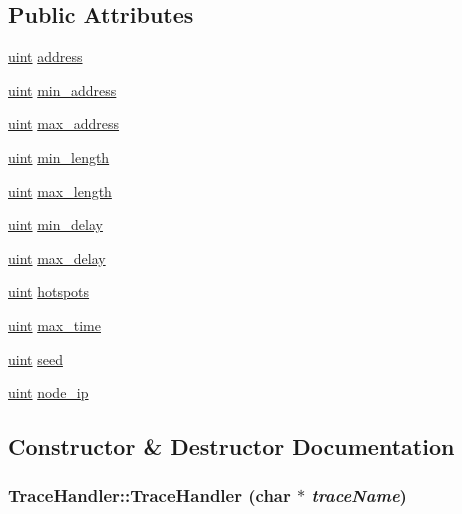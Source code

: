 \subsection*{Public Attributes}
\begin{CompactItemize}
\item 
\hyperlink{outputBuffer_8h_91ad9478d81a7aaf2593e8d9c3d06a14}{uint} \hyperlink{classTraceHandler_ea33725c91bfe1fa432e76eade7712ed}{address}
\item 
\hyperlink{outputBuffer_8h_91ad9478d81a7aaf2593e8d9c3d06a14}{uint} \hyperlink{classTraceHandler_b7fa64138639a68dd88fd66314824325}{min\_\-address}
\item 
\hyperlink{outputBuffer_8h_91ad9478d81a7aaf2593e8d9c3d06a14}{uint} \hyperlink{classTraceHandler_0e4320c5937dc70f0fc5c636945cdd7a}{max\_\-address}
\item 
\hyperlink{outputBuffer_8h_91ad9478d81a7aaf2593e8d9c3d06a14}{uint} \hyperlink{classTraceHandler_621a0abf23e7fd289a1285c65ff86a39}{min\_\-length}
\item 
\hyperlink{outputBuffer_8h_91ad9478d81a7aaf2593e8d9c3d06a14}{uint} \hyperlink{classTraceHandler_d1bc3509a772510d67fadefe19dfdf0f}{max\_\-length}
\item 
\hyperlink{outputBuffer_8h_91ad9478d81a7aaf2593e8d9c3d06a14}{uint} \hyperlink{classTraceHandler_f652021bf07882581c682b0d5484848c}{min\_\-delay}
\item 
\hyperlink{outputBuffer_8h_91ad9478d81a7aaf2593e8d9c3d06a14}{uint} \hyperlink{classTraceHandler_4124bf3570c1c8122ab6f33c4793ca96}{max\_\-delay}
\item 
\hyperlink{outputBuffer_8h_91ad9478d81a7aaf2593e8d9c3d06a14}{uint} \hyperlink{classTraceHandler_43e0f60dfc44c9ab35598ddcfdda71a4}{hotspots}
\item 
\hyperlink{outputBuffer_8h_91ad9478d81a7aaf2593e8d9c3d06a14}{uint} \hyperlink{classTraceHandler_3177fdea2d36bab7c0d153291c37127e}{max\_\-time}
\item 
\hyperlink{outputBuffer_8h_91ad9478d81a7aaf2593e8d9c3d06a14}{uint} \hyperlink{classTraceHandler_5a0af043673b7c8e6c17e965420c8a64}{seed}
\item 
\hyperlink{outputBuffer_8h_91ad9478d81a7aaf2593e8d9c3d06a14}{uint} \hyperlink{classTraceHandler_b54df7fbf5273b6132975f3e5bf26057}{node\_\-ip}
\end{CompactItemize}


\subsection{Constructor \& Destructor Documentation}
\hypertarget{classTraceHandler_4aa3f9f12e40d05263ab1d973824bae1}{
\subsubsection[{TraceHandler}]{\setlength{\rightskip}{0pt plus 5cm}TraceHandler::TraceHandler (char $\ast$ {\em traceName})}}
\label{classTraceHandler_4aa3f9f12e40d05263ab1d973824bae1}


